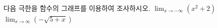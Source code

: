 다음 극한을 함수의 그래프를 이용하여 조사하시오.
 $\displaystyle\lim_{x\to -\infty}(x^2+2)$
 $\displaystyle\lim_{x\to\infty}(-\sqrt{5+x})$
